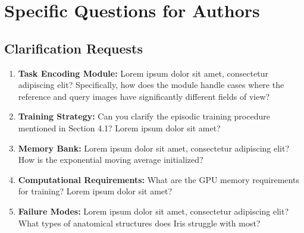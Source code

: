 \section{Specific Questions for Authors}
\label{sec:questions_authors}

\subsection{Clarification Requests}
\begin{enumerate}
    \item \textbf{Task Encoding Module:} Lorem ipsum dolor sit amet, consectetur adipiscing elit? Specifically, how does the module handle cases where the reference and query images have significantly different fields of view?
    
    \item \textbf{Training Strategy:} Can you clarify the episodic training procedure mentioned in Section 4.1? Lorem ipsum dolor sit amet?
    
    \item \textbf{Memory Bank:} Lorem ipsum dolor sit amet, consectetur adipiscing elit? How is the exponential moving average initialized?
    
    \item \textbf{Computational Requirements:} What are the GPU memory requirements for training? Lorem ipsum dolor sit amet?
    
    \item \textbf{Failure Modes:} Lorem ipsum dolor sit amet, consectetur adipiscing elit? What types of anatomical structures does Iris struggle with most?
\end{enumerate}

